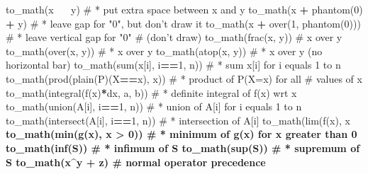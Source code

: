 \documentclass[
]{krantz}
\makeatletter
\newenvironment{Shaded}{\begin{snugshade}}{\end{snugshade}}
\newcommand{\CommentTok}[1]{\textcolor[rgb]{0.56,0.35,0.01}{\textit{#1}}}
\newcommand{\DecValTok}[1]{\textcolor[rgb]{0.00,0.00,0.81}{#1}}
\newcommand{\ErrorTok}[1]{\textcolor[rgb]{0.64,0.00,0.00}{\textbf{#1}}}
\newcommand{\KeywordTok}[1]{\textcolor[rgb]{0.13,0.29,0.53}{\textbf{#1}}}
\newcommand{\NormalTok}[1]{#1}
\newcommand{\OperatorTok}[1]{\textcolor[rgb]{0.81,0.36,0.00}{\textbf{#1}}}
\newcommand{\StringTok}[1]{\textcolor[rgb]{0.31,0.60,0.02}{#1}}
\newenvironment{kframe}{%
\medskip{}
\setlength{\fboxsep}{.8em}
 \def\at@end@of@kframe{}%
 \ifinner\ifhmode%
  \def\at@end@of@kframe{\end{minipage}}%
  \begin{minipage}{\columnwidth}%
 \fi\fi%
 \def\FrameCommand##1{\hskip\@totalleftmargin \hskip-\fboxsep
 \colorbox{shadecolor}{##1}\hskip-\fboxsep
     \hskip-\linewidth \hskip-\@totalleftmargin \hskip\columnwidth}%
 \MakeFramed {\advance\hsize-\width
   \@totalleftmargin\z@ \linewidth\hsize
   \@setminipage}}%
 {\par\unskip\endMakeFramed%
 \at@end@of@kframe}
\renewenvironment{Shaded}{\begin{kframe}}{\end{kframe}}
\renewcommand{\KeywordTok} [1]{\textcolor[rgb]{0.00,0.44,0.13}{{#1}}}
\renewcommand{\DecValTok}  [1]{\textcolor[rgb]{0.25,0.63,0.44}{{#1}}}
\renewcommand{\StringTok}  [1]{\textcolor[rgb]{0.25,0.44,0.63}{{#1}}}
\renewcommand{\CommentTok} [1]{\textcolor[rgb]{0.38,0.63,0.69}{{#1}}}
\renewcommand{\ErrorTok}   [1]{\textcolor[rgb]{1.00,0.00,0.00}{{#1}}}
\renewcommand{\NormalTok}  [1]{{#1}}
\makeatother
\begin{document}
\begin{Shaded}
\begin{Highlighting}[]
{{{{{{{{{{{{{{{{{{{{{{{{{{\KeywordTok{to_math}\NormalTok{(x }\OperatorTok{~}\ErrorTok{~}\StringTok{ }\NormalTok{y)          }\CommentTok{# * put extra space between x and y}
\KeywordTok{to_math}\NormalTok{(x }\OperatorTok{+}\StringTok{ }\KeywordTok{phantom}\NormalTok{(}\DecValTok{0}\NormalTok{) }\OperatorTok{+}\StringTok{ }\NormalTok{y)  }\CommentTok{# * leave gap for "0", but don't draw it}
\KeywordTok{to_math}\NormalTok{(x }\OperatorTok{+}\StringTok{ }\KeywordTok{over}\NormalTok{(}\DecValTok{1}\NormalTok{, }\KeywordTok{phantom}\NormalTok{(}\DecValTok{0}\NormalTok{)))  }\CommentTok{# * leave vertical gap for "0"}
\CommentTok{# (don't draw)}
\KeywordTok{to_math}\NormalTok{(}\KeywordTok{frac}\NormalTok{(x, y))      }\CommentTok{#   x over y}
\KeywordTok{to_math}\NormalTok{(}\KeywordTok{over}\NormalTok{(x, y))      }\CommentTok{# * x over y}
\KeywordTok{to_math}\NormalTok{(}\KeywordTok{atop}\NormalTok{(x, y))      }\CommentTok{# * x over y (no horizontal bar)}
\KeywordTok{to_math}\NormalTok{(}\KeywordTok{sum}\NormalTok{(x[i], i}\OperatorTok{==}\DecValTok{1}\NormalTok{, n))  }\CommentTok{# * sum x[i] for i equals 1 to n}
\KeywordTok{to_math}\NormalTok{(}\KeywordTok{prod}\NormalTok{(}\KeywordTok{plain}\NormalTok{(P)(X}\OperatorTok{==}\NormalTok{x), x))  }\CommentTok{# * product of P(X=x) for all}
\CommentTok{# values of x}
\KeywordTok{to_math}\NormalTok{(}\KeywordTok{integral}\NormalTok{(}\KeywordTok{f}\NormalTok{(x)}\OperatorTok{*}\NormalTok{dx, a, b))  }\CommentTok{# * definite integral of f(x) wrt x}
\KeywordTok{to_math}\NormalTok{(}\KeywordTok{union}\NormalTok{(A[i], i}\OperatorTok{==}\DecValTok{1}\NormalTok{, n))  }\CommentTok{# * union of A[i] for i equals 1 to n}
\KeywordTok{to_math}\NormalTok{(}\KeywordTok{intersect}\NormalTok{(A[i], i}\OperatorTok{==}\DecValTok{1}\NormalTok{, n)) }\CommentTok{# * intersection of A[i]}
\KeywordTok{to_math}\NormalTok{(}\KeywordTok{lim}\NormalTok{(}\KeywordTok{f}\NormalTok{(x), x }\OperatorTok{%
\KeywordTok{to_math}\NormalTok{(}\KeywordTok{min}\NormalTok{(}\KeywordTok{g}\NormalTok{(x), x }\OperatorTok{>}\StringTok{ }\DecValTok{0}\NormalTok{))  }\CommentTok{# * minimum of g(x) for x greater than 0}
\KeywordTok{to_math}\NormalTok{(}\KeywordTok{inf}\NormalTok{(S))          }\CommentTok{# * infimum of S}
\KeywordTok{to_math}\NormalTok{(}\KeywordTok{sup}\NormalTok{(S))          }\CommentTok{# * supremum of S}
\KeywordTok{to_math}\NormalTok{(x}\OperatorTok{^}\NormalTok{y }\OperatorTok{+}\StringTok{ }\NormalTok{z)         }\CommentTok{#   normal operator precedence}
}}}}}}}}}}}}}}}}}}}}}}}}}}}
\end{Highlighting}
\end{Shaded}
\end{document}
